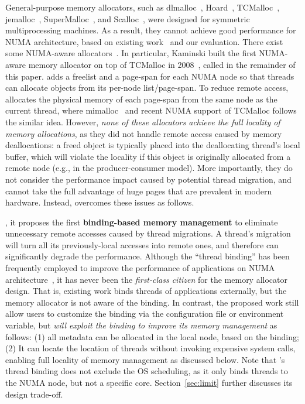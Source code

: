 General-purpose memory allocators, such as dlmalloc~\cite{dlmalloc},  Hoard~\cite{Hoard}, TCMalloc~\cite{tcmalloc}, jemalloc~\cite{jemalloc}, SuperMalloc~\cite{supermalloc}, and  Scalloc~\cite{Scalloc}, were designed for symmetric multiprocessing machines. As a result, they cannot achieve good performance for NUMA architecture, based on existing work~\cite{tcmallocnew, yang2019jarena} and our evaluation. There exist some NUMA-aware allocators~\cite{tcmallocnew, tcmalloc2, kim2013node, yang2019jarena, mimalloc}. In particular, Kaminski built the first NUMA-aware memory allocator on top of TCMalloc in 2008~\cite{tcmallocnew}, called \TN{} in the remainder of this paper. \TN{} adds a freelist  and a page-span for each NUMA node so that threads can allocate objects from its per-node list/page-span. To reduce remote access, \TN{} allocates the physical memory of each page-span from the same node as the current thread, where mimalloc~\cite{mimalloc} and recent NUMA support of TCMalloc follows the similar idea.  However, \textit{none of these allocators achieve the full locality of memory allocations}, as they did not handle remote access caused by memory deallocations: a freed object is typically placed into the deallocating thread's local buffer, which will violate the locality if this object is originally allocated from a remote node  (e.g., in the producer-consumer model). More importantly, they do not consider the performance impact caused by potential thread migration, and  cannot take the full advantage of huge pages that are prevalent in modern hardware. Instead, \NM{} overcomes these issues as follows. 

, it proposes the first \textbf{binding-based memory management} to eliminate unnecessary remote accesses caused by thread migrations. A thread's migration will turn all its previously-local accesses into remote ones, and therefore can significantly degrade the performance. Although the ``thread binding'' has been frequently employed to improve the performance of applications on NUMA architecture~\cite{li2013numa, XuNuma, Lepers:2015:TMP:2813767.2813788}, it has never been the \textit{first-class citizen} for the memory allocator design. That is, existing work  binds threads of applications externally,  but the memory allocator is not aware of the binding. In contrast, the proposed work still allow users to customize the binding via the configuration file or environment variable, but \textit{will exploit the binding to improve its memory management} as follows: (1) all metadata can be allocated in the local node, based on the binding; (2) It can locate the location of threads without invoking expensive system calls, enabling full locality of memory management as discussed below. Note that \NM{}'s thread binding does not exclude the OS scheduling, as it only binds threads to the NUMA node, but not a specific core. Section~\ref{sec:limit} further discusses its design trade-off.  



